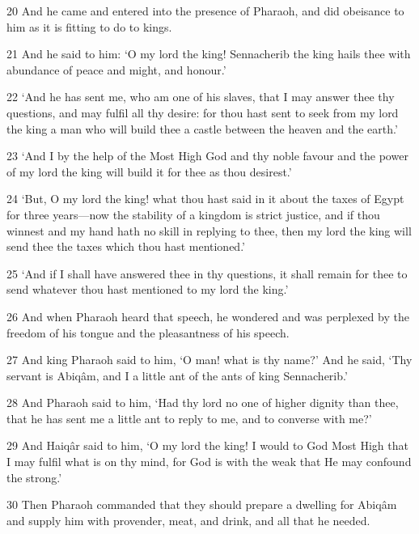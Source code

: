\par 20 And he came and entered into the presence of Pharaoh, and did obeisance to him as it is fitting to do to kings.

\par 21 And he said to him: ‘O my lord the king! Sennacherib the king hails thee with abundance of peace and might, and honour.’

\par 22 ‘And he has sent me, who am one of his slaves, that I may answer thee thy questions, and may fulfil all thy desire: for thou hast sent to seek from my lord the king a man who will build thee a castle between the heaven and the earth.’

\par 23 ‘And I by the help of the Most High God and thy noble favour and the power of my lord the king will build it for thee as thou desirest.’

\par 24 ‘But, O my lord the king! what thou hast said in it about the taxes of Egypt for three years—now the stability of a kingdom is strict justice, and if thou winnest and my hand hath no skill in replying to thee, then my lord the king will send thee the taxes which thou hast mentioned.’

\par 25 ‘And if I shall have answered thee in thy questions, it shall remain for thee to send whatever thou hast mentioned to my lord the king.’

\par 26 And when Pharaoh heard that speech, he wondered and was perplexed by the freedom of his tongue and the pleasantness of his speech.

\par 27 And king Pharaoh said to him, ‘O man! what is thy name?’ And he said, ‘Thy servant is Abiqâm, and I a little ant of the ants of king Sennacherib.’

\par 28 And Pharaoh said to him, ‘Had thy lord no one of higher dignity than thee, that he has sent me a little ant to reply to me, and to converse with me?’

\par 29 And Haiqâr said to him, ‘O my lord the king! I would to God Most High that I may fulfil what is on thy mind, for God is with the weak that He may confound the strong.’

\par 30 Then Pharaoh commanded that they should prepare a dwelling for Abiqâm and supply him with provender, meat, and drink, and all that he needed.

